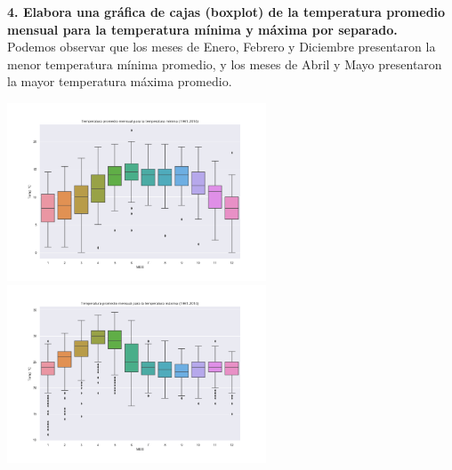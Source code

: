 \documentclass[12pt]{article}
\begin{document}
\noindent\textbf {4. Elabora una gráfica de cajas (boxplot) de la temperatura promedio mensual para la temperatura mínima y máxima por separado.} \\
Podemos observar que los meses de Enero, Febrero y Diciembre presentaron la menor temperatura mínima promedio, y los meses de Abril y Mayo presentaron la mayor temperatura máxima promedio.
\begin{center}
\includegraphics[height=5.3cm]{Temp_prommenmin.png}
\hspace*{\fill}
\includegraphics[height=5.3cm]{Temp_prommenmax.png}
\end{center} 
\end{document}
